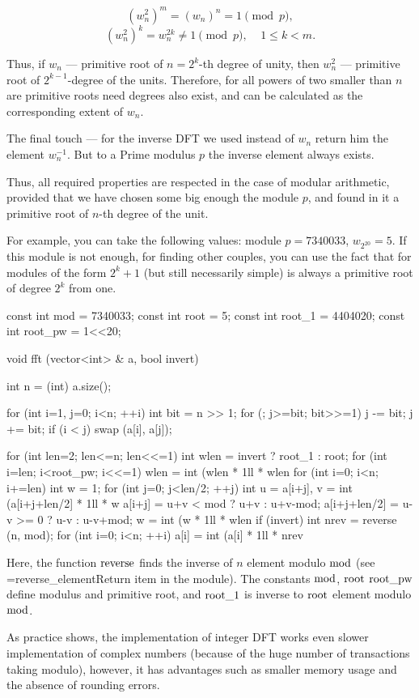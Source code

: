 $$ (w_n^2)^m = (w_n)^n = 1 \pmod p, $$
$$ (w_n^2)^k = w_n^{2k} \ne 1 {\pmod p}, ~~~~~ 1 \le k < m. $$

Thus, if $w_n$ --- primitive root of $n=2^k$-th degree of unity, then $w_n^2$ --- primitive root of $2^{k-1}$-degree of the units. Therefore, for all powers of two smaller than $n$ are primitive roots need degrees also exist, and can be calculated as the corresponding extent of $w_n$.

The final touch --- for the inverse DFT we used instead of $w_n$ return him the element $w_n^{-1}$. But to a Prime modulus $p$ the inverse element always exists.

Thus, all required properties are respected in the case of modular arithmetic, provided that we have chosen some big enough the module $p$, and found in it a primitive root of $n$-th degree of the unit.

For example, you can take the following values: module $p = 7340033$, $w_{2^{20}} = 5$. If this module is not enough, for finding other couples, you can use the fact that for modules of the form $2^k + 1$ (but still necessarily simple) is always a primitive root of degree $2^k$ from one.

\code
const int mod = 7340033;
const int root = 5;
const int root_1 = 4404020;
const int root_pw = 1<<20;

void fft (vector<int> & a, bool invert) {
int n = (int) a.size();

for (int i=1, j=0; i<n; ++i) {
int bit = n >> 1;
for (; j>=bit; bit>>=1)
j -= bit;
j += bit;
if (i < j)
swap (a[i], a[j]);
}

for (int len=2; len<=n; len<<=1) {
int wlen = invert ? root_1 : root;
for (int i=len; i<root_pw; i<<=1)
wlen = int (wlen * 1ll * wlen %
for (int i=0; i<n; i+=len) {
int w = 1;
for (int j=0; j<len/2; ++j) {
int u = a[i+j], v = int (a[i+j+len/2] * 1ll * w %
a[i+j] = u+v < mod ? u+v : u+v-mod;
a[i+j+len/2] = u-v >= 0 ? u-v : u-v+mod;
w = int (w * 1ll * wlen %
}
}
}
if (invert) {
int nrev = reverse (n, mod);
for (int i=0; i<n; ++i)
a[i] = int (a[i] * 1ll * nrev %
}
}
\endcode

Here, the function $\rm reverse$ finds the inverse of $n$ element modulo $\rm mod$ (see \algohref=reverse_element{Return item in the module}). The constants $\rm mod$, $\rm root$ $\rm root\_pw$ define modulus and primitive root, and $\rm root\_1$ is inverse to $\rm root$ element modulo $\rm mod$.

As practice shows, the implementation of integer DFT works even slower implementation of complex numbers (because of the huge number of transactions taking modulo), however, it has advantages such as smaller memory usage and the absence of rounding errors.


